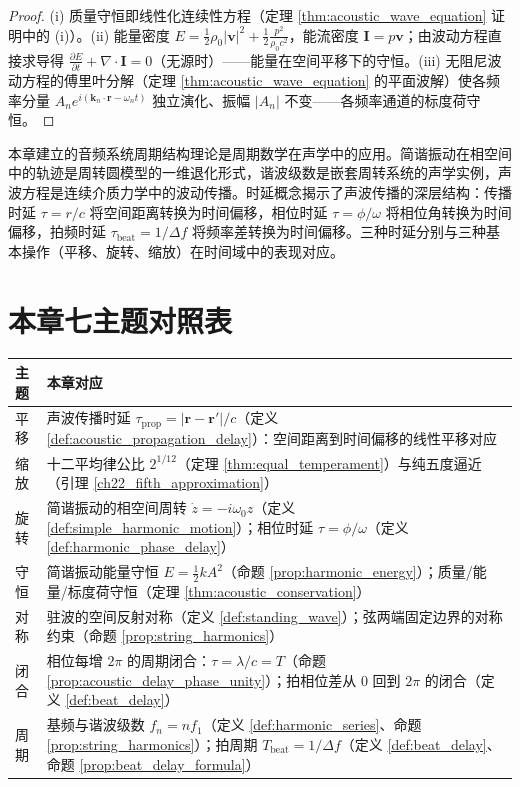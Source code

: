 \begin{proof}
(i) 质量守恒即线性化连续性方程（定理 \ref{thm:acoustic_wave_equation} 证明中的 (i)）。(ii) 能量密度 $E = \frac{1}{2}\rho_0|\mathbf{v}|^2 + \frac{1}{2}\frac{p^2}{\rho_0 c^2}$，能流密度 $\mathbf{I} = p\mathbf{v}$；由波动方程直接求导得 $\frac{\partial E}{\partial t} + \nabla\cdot\mathbf{I} = 0$（无源时）——能量在空间平移下的守恒。(iii) 无阻尼波动方程的傅里叶分解（定理 \ref{thm:acoustic_wave_equation} 的平面波解）使各频率分量 $A_n e^{i(\mathbf{k}_n\cdot\mathbf{r} - \omega_n t)}$ 独立演化、振幅 $|A_n|$ 不变——各频率通道的标度荷守恒。
\end{proof}

\begin{remark}[与全书的衔接]
本章建立的音频系统周期结构理论是周期数学在声学中的应用。简谐振动在相空间中的轨迹是周转圆模型的一维退化形式，谐波级数是嵌套周转系统的声学实例，声波方程是连续介质力学中的波动传播。时延概念揭示了声波传播的深层结构：传播时延 $\tau = r/c$ 将空间距离转换为时间偏移，相位时延 $\tau = \phi/\omega$ 将相位角转换为时间偏移，拍频时延 $\tau_{\text{beat}} = 1/\Delta f$ 将频率差转换为时间偏移。三种时延分别与三种基本操作（平移、旋转、缩放）在时间域中的表现对应。
\end{remark}

\section*{本章七主题对照表}

\begin{center}
\begin{tabular}{>{\centering\arraybackslash}p{2.2cm}>{\centering\arraybackslash}p{10.5cm}}
\toprule
主题 & 本章对应 \\
\midrule
平移 & 声波传播时延 $\tau_{\text{prop}} = |\mathbf{r}-\mathbf{r}'|/c$（定义 \ref{def:acoustic_propagation_delay}）：空间距离到时间偏移的线性平移对应 \\
缩放 & 十二平均律公比 $2^{1/12}$（定理 \ref{thm:equal_temperament}）与纯五度逼近（引理 \ref{ch22_fifth_approximation}） \\
旋转 & 简谐振动的相空间周转 $\dot z = -i\omega_0 z$（定义 \ref{def:simple_harmonic_motion}）；相位时延 $\tau = \phi/\omega$（定义 \ref{def:harmonic_phase_delay}） \\
守恒 & 简谐振动能量守恒 $E = \frac{1}{2}kA^2$（命题 \ref{prop:harmonic_energy}）；质量/能量/标度荷守恒（定理 \ref{thm:acoustic_conservation}） \\
对称 & 驻波的空间反射对称（定义 \ref{def:standing_wave}）；弦两端固定边界的对称约束（命题 \ref{prop:string_harmonics}） \\
闭合 & 相位每增 $2\pi$ 的周期闭合：$\tau = \lambda/c = T$（命题 \ref{prop:acoustic_delay_phase_unity}）；拍相位差从 $0$ 回到 $2\pi$ 的闭合（定义 \ref{def:beat_delay}） \\
周期 & 基频与谐波级数 $f_n = n f_1$（定义 \ref{def:harmonic_series}、命题 \ref{prop:string_harmonics}）；拍周期 $T_{\text{beat}} = 1/\Delta f$（定义 \ref{def:beat_delay}、命题 \ref{prop:beat_delay_formula}） \\
\bottomrule
\end{tabular}
\end{center}

